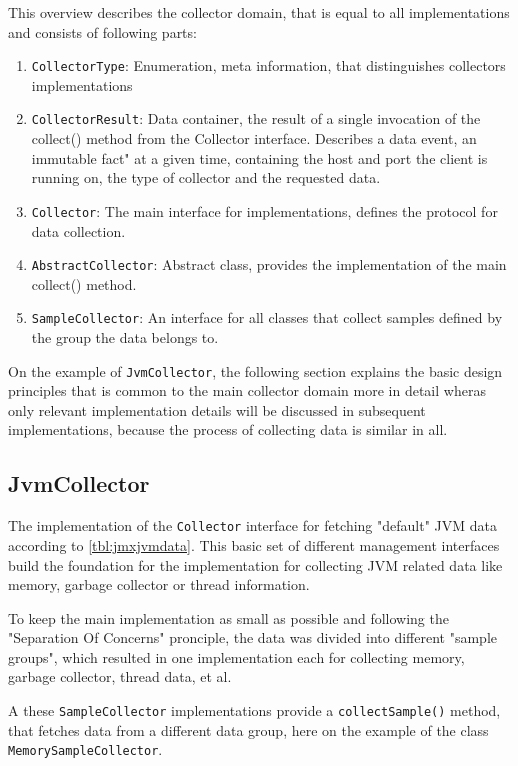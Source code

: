 This overview describes the collector domain, that is equal to all implementations and consists of following parts:
\begin{enumerate}
    \item \verb|CollectorType|:
    Enumeration, meta information, that distinguishes collectors implementations
    \item \verb|CollectorResult|: Data container, the result of a single invocation of the collect() method from
    the Collector interface. Describes a data event, an immutable fact" at a given time, containing the host and port
    the client is running on, the type of collector and the requested data.
    \item \verb|Collector|: The main interface for implementations, defines the protocol for data collection.
    \item \verb|AbstractCollector|: Abstract class, provides the implementation of the main collect() method.
    \item \verb|SampleCollector|: An interface for all classes that collect samples defined by the group the data
    belongs to.
\end{enumerate}

On the example of \verb|JvmCollector|, the following section explains the basic design principles that is common
to the main collector domain more in detail wheras only relevant implementation details will be discussed in
subsequent implementations, because the process of collecting data is similar in all.

\subsection{JvmCollector}
\label{subsec:impl-jvmcollector}

The implementation of the \verb|Collector| interface for fetching "default" JVM data according to \autoref{tbl:jmxjvmdata}.
This basic set of different management interfaces build the foundation
for the implementation for collecting JVM related data like memory, garbage collector or thread information.

To keep the main implementation as small as possible and following the "Separation Of Concerns" pronciple,
the data was divided into different "sample groups", which resulted in one implementation each for collecting
memory, garbage collector, thread data, et al.

A these \verb|SampleCollector| implementations provide a  \verb|collectSample()| method, that fetches data from a different data group, here
on the example of the class \verb|MemorySampleCollector|.

